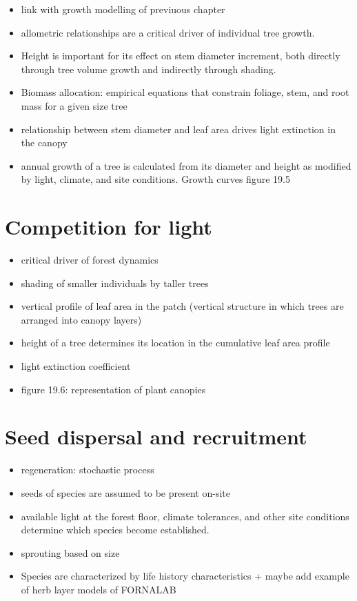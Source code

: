 \documentclass[oneside]{book}
\providecommand{\tightlist}{%
  \setlength{\itemsep}{0pt}\setlength{\parskip}{0pt}}
\begin{document}
\begin{itemize}
\tightlist
\item
  link with growth modelling of previuous chapter
\item
  allometric relationships are a critical driver of individual tree
  growth.
\item
  Height is important for its effect on stem diameter increment, both
  directly through tree volume growth and indirectly through shading.
\item
  Biomass allocation: empirical equations that constrain foliage, stem,
  and root mass for a given size tree
\item
  relationship between stem diameter and leaf area drives light
  extinction in the canopy
\item
  annual growth of a tree is calculated from its diameter and height as
  modified by light, climate, and site conditions. Growth curves figure
  19.5
\end{itemize}

\section{Competition for light}\label{competition-for-light}

\begin{itemize}
\tightlist
\item
  critical driver of forest dynamics
\item
  shading of smaller individuals by taller trees
\item
  vertical profile of leaf area in the patch (vertical structure in
  which trees are arranged into canopy layers)
\item
  height of a tree determines its location in the cumulative leaf area
  profile
\item
  light extinction coefficient
\item
  figure 19.6: representation of plant canopies
\end{itemize}

\section{Seed dispersal and
recruitment}\label{seed-dispersal-and-recruitment}

\begin{itemize}
\item
  regeneration: stochastic process
\item
  seeds of species are assumed to be present on-site
\item
  available light at the forest floor, climate tolerances, and other
  site conditions determine which species become established.
\item
  sprouting based on size
\item
  Species are characterized by life history characteristics + maybe add
  example of herb layer models of FORNALAB
\end{itemize}
\end{document}
